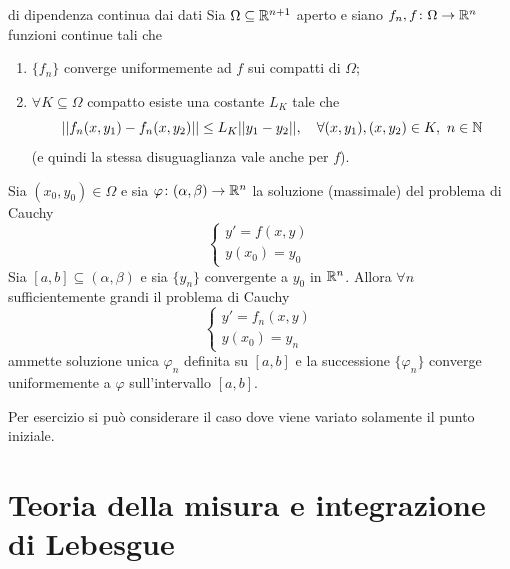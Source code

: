 \documentclass[a4paper]{article}
\begin{document}
\begin{radioactive}
\begin{snippettheorem}{di dipendenza continua dai dati}
    Sia \(\Omega \subseteq \mathbb{R}^{n+1}\) aperto e siano
    \(f_n, f \colon \Omega \to \mathbb{R}^n\)
    funzioni continue tali che
    \begin{enumerate}
        \item \(\{f_n\}\) converge uniformemente ad \(f\) sui compatti di \(\Omega\);
        \item \(\forall K \subseteq \Omega\) compatto esiste una costante \(L_K\)
            tale che \[
                ||f_n(x, y_1) - f_n(x, y_2)||
                \leq L_K||y_1-y_2||, \quad \forall (x,y_1),(x,y_2) \in K,\ n \in \mathbb{N}
            \]
            (e quindi la stessa disuguaglianza vale anche per \(f\)).
    \end{enumerate}
    Sia \((x_0, y_0) \in \Omega\) e sia \(\varphi \colon (\alpha, \beta) \to \mathbb{R}^n\)
    la soluzione (massimale) del problema di Cauchy
    \[
        \begin{cases}
            y' = f(x,y) \\
            y(x_0) = y_0
        \end{cases}
    \]
    Sia \([a, b] \subseteq (\alpha, \beta)\) e sia \(\{y_n\}\)
    convergente a \(y_0\) in \(\mathbb{R}^n\).
    Allora \(\forall n\) sufficientemente grandi il problema di Cauchy
    \[
        \begin{cases}
            y' = f_n(x,y) \\
            y(x_0) = y_n
        \end{cases}
    \]
    ammette soluzione unica \(\varphi_n\) definita su \([a,b]\)
    e la successione \(\{\varphi_n\}\) converge uniformemente a \(\varphi\)
    sull'intervallo \([a,b]\).
\end{snippettheorem}
\end{radioactive}

\begin{radioactive}
Per esercizio si può considerare il caso dove viene variato solamente il punto iniziale.
\end{radioactive}

\pagebreak

\part{Teoria della misura e integrazione di Lebesgue}
\end{document}
